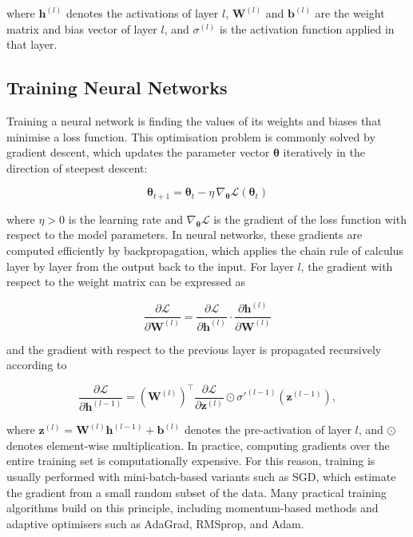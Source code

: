 where $\mathbf{h}^{(l)}$ denotes the activations of layer $l$, $\mathbf{W}^{(l)}$ and $\mathbf{b}^{(l)}$ are the weight matrix and bias vector of layer $l$, and $\sigma^{(l)}$ is the activation function applied in that layer.

\subsection{Training Neural Networks}
\label{subsec:training_nns}
Training a neural network is finding the values of its weights and biases that minimise a loss function. This optimisation problem is commonly solved by gradient descent, which updates the parameter vector $\boldsymbol{\theta}$ iteratively in the direction of steepest descent:

\begin{equation}
  \boldsymbol{\theta}_{t+1} = \boldsymbol{\theta}_{t} - \eta \, \nabla_{\boldsymbol{\theta}} \mathcal{L}(\boldsymbol{\theta}_{t})
  \label{eq:gradient-descent}
\end{equation}

where $\eta > 0$ is the learning rate and $\nabla_{\boldsymbol{\theta}} \mathcal{L}$ is the gradient of the loss function with respect to the model parameters. In neural networks, these gradients are computed efficiently by backpropagation, which applies the chain rule of calculus layer by layer from the output back to the input. For layer $l$, the gradient with respect to the weight matrix can be expressed as

\begin{equation}
  \frac{\partial \mathcal{L}}{\partial \mathbf{W}^{(l)}} = \frac{\partial \mathcal{L}}{\partial \mathbf{h}^{(l)}} \cdot \frac{\partial \mathbf{h}^{(l)}}{\partial \mathbf{W}^{(l)}}
  \label{eq:backprop-weight-gradient}
\end{equation}

and the gradient with respect to the previous layer is propagated recursively according to

\begin{equation}
  \frac{\partial \mathcal{L}}{\partial \mathbf{h}^{(l-1)}} = \left( \mathbf{W}^{(l)} \right)^{\top} \frac{\partial \mathcal{L}}{\partial \mathbf{z}^{(l)}} \odot \sigma'^{(l-1)} \left( \mathbf{z}^{(l-1)} \right),
  \label{eq:backprop-hidden-gradient}
\end{equation}

where $\mathbf{z}^{(l)} = \mathbf{W}^{(l)} \mathbf{h}^{(l-1)} + \mathbf{b}^{(l)}$ denotes the pre-activation of layer $l$, and $\odot$ denotes element-wise multiplication. In practice, computing gradients over the entire training set is computationally expensive. For this reason, training is usually performed with mini-batch-based variants such as \ac{SGD}, which estimate the gradient from a small random subset of the data. Many practical training algorithms build on this principle, including momentum-based methods and adaptive optimisers such as AdaGrad, RMSprop, and Adam.

